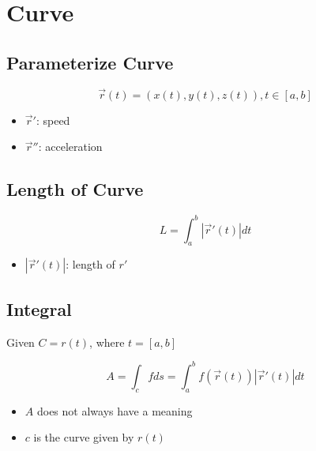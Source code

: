 \section{Curve}

  \subsection{Parameterize Curve}

    \begin{equation}
      \vec{r}\left( t \right) = \left( x(t), y(t), z(t) \right), t \in \left[ a, b \right]
    \end{equation}

    \begin{itemize}
      \item $ \vec{r}' $: speed
      \item $ \vec{r}'' $: acceleration
    \end{itemize}

  \subsection{Length of Curve}

    \begin{equation}
      L = \int_{a}^{b} \left| \vec{r}'\left( t \right) \right| dt
    \end{equation}

    \begin{itemize}
      \item $ \left| \vec{r}'\left( t \right) \right| $: length of $ r' $
    \end{itemize}

  \subsection{Integral}

    Given $ C = r\left( t \right) $, where $ t = \left[ a, b \right] $

    \begin{equation}
      A = \int_{c} fds = \int_{a}^{b} f\left( \vec{r}(t) \right) \left| \vec{r}'(t) \right| dt
    \end{equation}

    \begin{itemize}
      \item $ A $ does not always have a meaning
      \item $ c $ is the curve given by $ r\left( t \right) $
    \end{itemize}

